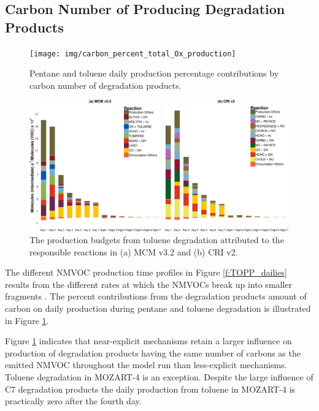
\subsection{Carbon Number of  Producing Degradation Products} \label{ss:c_number} %

\begin{figure}
    \begin{center}
        \texttt{[image: img/carbon\_percent\_total\_Ox\_production]}
    \end{center}
    \caption{Pentane and toluene daily  production percentage contributions by carbon number of degradation products.}
    \label{f:percent_carbon}
\end{figure}

\begin{figure}
    \begin{center}
        \includegraphics[width=\textwidth]{img/TOL_MCM_CRI_HO2x_intermediates}
        \caption{The  production budgets from toluene degradation attributed to the responsible reactions in (a) MCM v3.2 and (b) CRI v2.}
        \label{f:toluene_HO2x}
    \end{center}
\end{figure} 

The different NMVOC  production time profiles in Figure \ref{f:TOPP_dailies} results from the different rates at which the NMVOCs break up into smaller fragments \citep{Butler:2011}.
The percent contributions from the degradation products amount of carbon on daily  production during pentane and toluene degradation is illustrated in Figure \ref{f:percent_carbon}.

Figure \ref{f:percent_carbon} indicates that near-explicit mechanisms retain a larger influence on  production of degradation products having the same number of carbons as the emitted NMVOC throughout the model run than less-explicit mechanisms.
Toluene degradation in MOZART-4 is an exception.
Despite the large influence of C7 degradation products the daily  production from toluene in MOZART-4 is practically zero after the fourth day.

